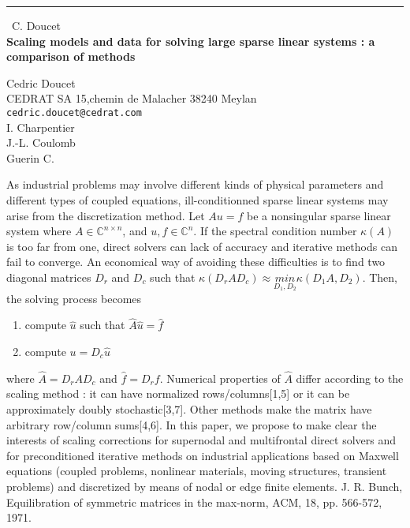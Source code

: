 \documentclass{report}
\begin{document}
\begin{center}
\rule{6in}{1pt} \
{\large C. Doucet \\
{\bf Scaling models and data for solving large sparse linear systems : a comparison of methods}}

Cedric Doucet \\ CEDRAT SA 15,chemin de Malacher 38240 Meylan
\\
{\tt cedric.doucet@cedrat.com}\\
I. Charpentier\\
J.-L. Coulomb\\
	Guerin C.\end{center}

As industrial problems may involve different kinds of physical parameters
and different types of coupled equations, ill-conditionned sparse linear
systems may arise from the discretization method. Let $Au=f$ be a
nonsingular sparse linear system where $A\in \mathbb{C}^{n\times n}$, and
$u,f\in \mathbb{C}^n$. If the spectral condition number $\kappa(A)$ is
too far from one, direct solvers can lack of accuracy and iterative
methods can fail to converge. An economical way of avoiding these
difficulties is to find two diagonal matrices $D_r$ and $D_c$ such that
$\kappa(D_rAD_c) \approx \underset{D_1,D_2}{min}{\kappa(D_1A,D_2)}$.
Then, the solving process becomes
\begin{enumerate}
\item compute $\hat{u}$ such that $\hat{A}\hat{u}=\hat{f}$
\item compute $u = D_c\hat{u}$
\end{enumerate}
where $\hat{A}= D_rAD_c$ and $\hat{f}=D_rf$. Numerical properties of
$\hat{A}$ differ according to the scaling method : it can have normalized
rows/columns[1,5] or it can be approximately doubly stochastic[3,7].
Other methods make the matrix have arbitrary row/column sums[4,6]. In
this paper, we propose to make clear the interests of scaling corrections
for supernodal and multifrontal direct solvers and for preconditioned
iterative methods on industrial applications based on Maxwell equations
(coupled problems, nonlinear materials, moving structures, transient
problems) and discretized by means of nodal or edge finite elements.
\newline
\newline
{}
\newline
[1] J. R. Bunch, Equilibration of symmetric matrices in the max-norm,
ACM, 18, pp. 566-572, 1971.
\newline
\end{document}
